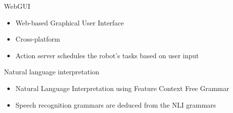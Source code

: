 \documentclass[a4paper,12pt]{article}
\newcommand{\emptylogo}{\texttt{[image: Figures/Empty]}}
\begin{document}
\begin{slidetop}
\begin{multicols}{2}
\begin{bclogo}[couleur = white, arrondi = 0.25, couleurBord = tuedarkblue, epBarre = 0, logo=\emptylogo]{\textcolor{tuedarkblue}{WebGUI}}
\begin{itemize}[itemsep = 0pt, parsep = 0pt, leftmargin=15pt]
	\item Web-based Graphical User Interface
	\item Cross-platform
	\item Action server schedules the robot's tasks based on user input
\end{itemize}
\end{bclogo}

\vfill
\begin{bclogo}[couleur = white, arrondi = 0.25, couleurBord = tuedarkblue, epBarre = 0, logo=\emptylogo]{\textcolor{tuedarkblue}{Natural language interpretation}}
\bigskip
\begin{itemize}[itemsep = 0pt, parsep = 0pt, leftmargin=15pt]
	\item Natural Language Interpretation using Feature Context Free Grammar
	\item Speech recognition grammars are deduced from the NLI grammars

\end{itemize}
\end{bclogo}
\end{multicols}
\end{slidetop}
\end{document}
